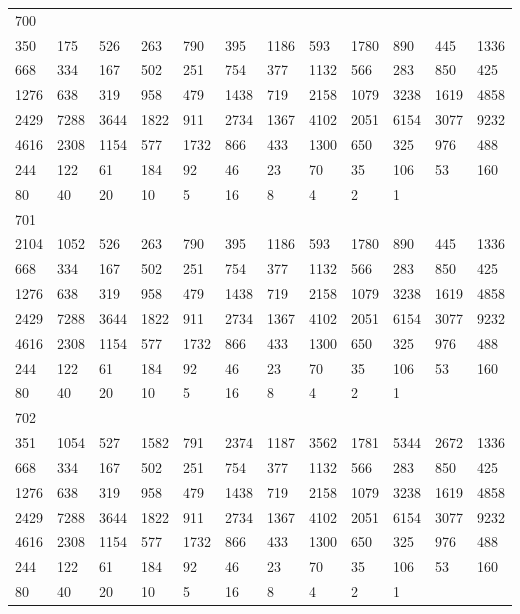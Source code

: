 \begin{longtable}{llllllllllll}
700&&&&&&&&&&&\\
350& 175& 526& 263& 790& 395& 1186& 593& 1780& 890& 445& 1336\\
668& 334& 167& 502& 251& 754& 377& 1132& 566& 283& 850& 425\\
1276& 638& 319& 958& 479& 1438& 719& 2158& 1079& 3238& 1619& 4858\\
2429& 7288& 3644& 1822& 911& 2734& 1367& 4102& 2051& 6154& 3077& 9232\\
4616& 2308& 1154& 577& 1732& 866& 433& 1300& 650& 325& 976& 488\\
244& 122& 61& 184& 92& 46& 23& 70& 35& 106& 53& 160\\
80& 40& 20& 10& 5& 16& 8& 4& 2& 1& \\

701&&&&&&&&&&&\\
2104& 1052& 526& 263& 790& 395& 1186& 593& 1780& 890& 445& 1336\\
668& 334& 167& 502& 251& 754& 377& 1132& 566& 283& 850& 425\\
1276& 638& 319& 958& 479& 1438& 719& 2158& 1079& 3238& 1619& 4858\\
2429& 7288& 3644& 1822& 911& 2734& 1367& 4102& 2051& 6154& 3077& 9232\\
4616& 2308& 1154& 577& 1732& 866& 433& 1300& 650& 325& 976& 488\\
244& 122& 61& 184& 92& 46& 23& 70& 35& 106& 53& 160\\
80& 40& 20& 10& 5& 16& 8& 4& 2& 1& \\

702&&&&&&&&&&&\\
351& 1054& 527& 1582& 791& 2374& 1187& 3562& 1781& 5344& 2672& 1336\\
668& 334& 167& 502& 251& 754& 377& 1132& 566& 283& 850& 425\\
1276& 638& 319& 958& 479& 1438& 719& 2158& 1079& 3238& 1619& 4858\\
2429& 7288& 3644& 1822& 911& 2734& 1367& 4102& 2051& 6154& 3077& 9232\\
4616& 2308& 1154& 577& 1732& 866& 433& 1300& 650& 325& 976& 488\\
244& 122& 61& 184& 92& 46& 23& 70& 35& 106& 53& 160\\
80& 40& 20& 10& 5& 16& 8& 4& 2& 1& \\


\end{longtable}
